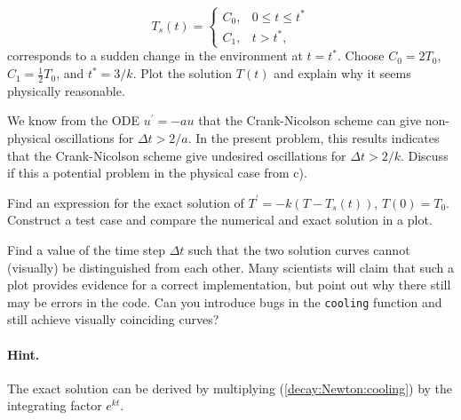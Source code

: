 \documentclass[graybox,sectrefs,envcountresetchap,open=right,final]{svmonodo}
\newenvironment{doconceexercise}{}{}
\begin{document}
\begin{doconceexercise}
\[ T_s(t) = \left\lbrace\begin{array}{ll} C_0,& 0\leq t\leq t^*\\ 
C_1, & t>t^*,\end{array}\right.
\]
corresponds to a sudden change in the environment
at $t=t^*$. Choose $C_0=2T_0$, $C_1=\frac{1}{2}T_0$, and
$t^*=3/k$. Plot the solution $T(t)$ and explain why it seems physically
reasonable.



We know from the ODE $u^\prime =-au$ that the Crank-Nicolson scheme
can give non-physical oscillations for $\Delta t > 2/a$.
In the present problem, this results indicates
that the Crank-Nicolson scheme give undesired
oscillations for $\Delta t > 2/k$.
Discuss if this a potential problem in the physical case from c).



Find an expression for the exact solution of
$T^{\prime} = -k(T-T_s(t))$, $T(0)=T_0$.
Construct a test case and compare the
numerical and exact solution in a plot.

Find a value of the time step
$\Delta t$ such that the two solution curves cannot (visually) be
distinguished from each other. Many scientists will claim that such a
plot provides evidence for a correct implementation, but point out why
there still may be errors in the code.  Can you introduce bugs in the
\texttt{cooling} function and still achieve visually coinciding curves?


\paragraph{Hint.}
The exact solution can be derived by multiplying (\ref{decay:Newton:cooling})
by the integrating factor $e^{kt}$.





\end{doconceexercise}
\end{document}
